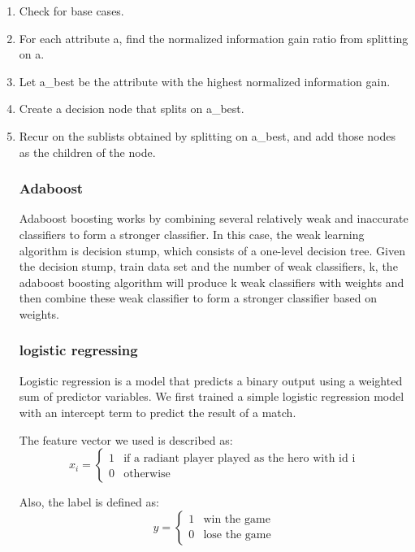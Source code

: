 \begin{enumerate}
\item Check for base cases.

\item For each attribute a, find the normalized information gain ratio from splitting on a.

\item Let a\_best be the attribute with the highest normalized information gain.

\item Create a decision node that splits on a\_best.

\item Recur on the sublists obtained by splitting on a\_best, and add those nodes as the children of the node.

\text{}

\subsubsection{Adaboost}
Adaboost boosting works by combining several relatively
weak and inaccurate classifiers to form a stronger classifier.
In this case, the weak learning algorithm is decision stump,
which consists of a one-level decision tree. Given the decision
stump, train data set and the number of weak classifiers,
k, the adaboost boosting algorithm will produce k weak classifiers
with weights and then combine these weak classifier to
form a stronger classifier based on weights.

\subsubsection{logistic regressing}
Logistic regression is a model that predicts a binary output using a weighted sum of predictor variables. We first trained a simple logistic regression model with an intercept term to
predict the result of a match.

The feature vector we used is described as:
$$ x_i=
\begin{cases}
1& \text{if a radiant player played as the hero with id i}\\
0& \text{otherwise}
\end{cases}$$

Also, the label is defined as:
$$y=
\begin{cases}
1& \text{win the game}\\
0& \text{lose the game}
\end{cases}$$


\end{enumerate}
